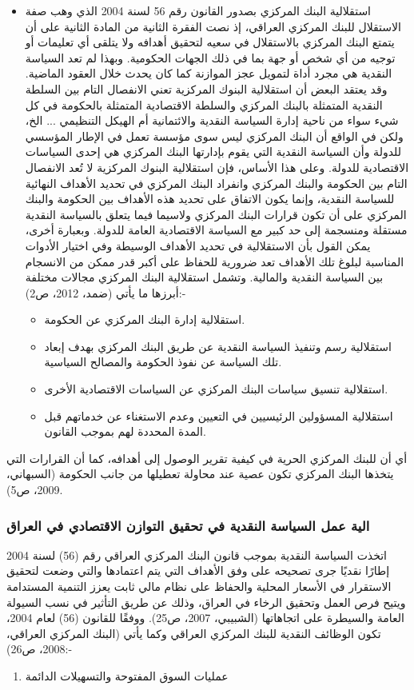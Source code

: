 \documentclass[10pt,a4paper]{report}
\begin{document}
\begin{doublespacing}
\begin{itemize}
	\item استقلالية البنك المركزي بصدور القانون رقم 56 لسنة 2004 الذي وهب صفة الاستقلال للبنك المركزي العراقي، إذ نصت الفقرة الثانية من المادة الثانية على أن يتمتع البنك المركزي بالاستقلال في سعيه لتحقيق أهدافه ولا يتلقى أي تعليمات أو توجيه من أي شخص أو جهة بما في ذلك الجهات الحكومية. وبهذا لم تعد السياسة النقدية هي مجرد أداة لتمويل عجز الموازنة كما كان يحدث خلال العقود الماضية. وقد يعتقد البعض أن استقلالية البنوك المركزية تعني الانفصال التام بين السلطة النقدية المتمثلة بالبنك المركزي والسلطة الاقتصادية المتمثلة بالحكومة في كل شيء سواء من ناحية إدارة السياسة النقدية والائتمانية أم الهيكل التنظيمي ... الخ، ولكن في الواقع أن البنك المركزي ليس سوى مؤسسة تعمل في الإطار المؤسسي للدولة وأن السياسة النقدية التي يقوم بإدارتها البنك المركزي هي إحدى السياسات الاقتصادية للدولة. وعلى هذا الأساس، فإن استقلالية البنوك المركزية لا تُعد الانفصال التام بين الحكومة والبنك المركزي وانفراد البنك المركزي في تحديد الأهداف النهائية للسياسة النقدية، وإنما يكون الاتفاق على تحديد هذه الأهداف بين الحكومة والبنك المركزي على أن تكون قرارات البنك المركزي ولاسيما فيما يتعلق بالسياسة النقدية مستقلة ومنسجمة إلى حد كبير مع السياسة الاقتصادية العامة للدولة. وبعبارة أخرى، يمكن القول بأن الاستقلالية في تحديد الأهداف الوسيطة وفي اختيار الأدوات المناسبة لبلوغ تلك الأهداف تعد ضرورية للحفاظ على أكبر قدر ممكن من الانسجام بين السياسة النقدية والمالية. وتشمل استقلالية البنك المركزي مجالات مختلفة أبرزها ما يأتي ({ضمد، 2012، ص2}):-
	\begin{itemize}
		\item استقلالية إدارة البنك المركزي عن الحكومة.
		\item استقلالية رسم وتنفيذ السياسة النقدية عن طريق البنك المركزي بهدف إبعاد تلك السياسة عن نفوذ الحكومة والمصالح السياسية.
		\item استقلالية تنسيق سياسات البنك المركزي عن السياسات الاقتصادية الأخرى.
		\item استقلالية المسؤولين الرئيسيين في التعيين وعدم الاستغناء عن خدماتهم قبل المدة المحددة لهم بموجب القانون.
	\end{itemize}
\end{itemize}
	أي أن للبنك المركزي الحرية في كيفية تقرير الوصول إلى أهدافه، كما أن القرارات التي يتخذها البنك المركزي تكون عصية عند محاولة تعطيلها من جانب الحكومة ({السبهاني، 2009، ص5}).
\subsubsection{الية عمل السياسة النقدية في تحقيق التوازن الاقتصادي في العراق}
اتخذت السياسة النقدية بموجب قانون البنك المركزي العراقي رقم (56) لسنة 2004 إطارًا نقديًا جرى تصحيحه على وفق الأهداف التي يتم اعتمادها والتي وضعت لتحقيق الاستقرار في الأسعار المحلية والحفاظ على نظام مالي ثابت يعزز التنمية المستدامة ويتيح فرص العمل وتحقيق الرخاء في العراق، وذلك عن طريق التأثير في نسب السيولة العامة والسيطرة على اتجاهاتها ({الشبيبي، 2007، ص25}). ووفقًا للقانون (56) لعام 2004، تكون الوظائف النقدية للبنك المركزي العراقي وكما يأتي ({البنك المركزي العراقي، 2008، ص26}):-
\begin{enumerate}
	\item عمليات السوق المفتوحة والتسهيلات الدائمة 
	

\end{enumerate}
\end{doublespacing}
\end{document}
